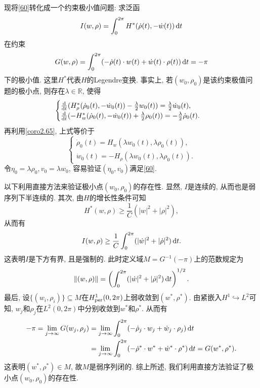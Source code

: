 \documentclass[12pt,a4paper]{article}
\begin{document}
现将\eqref{60}转化成一个约束极小值问题: 求泛函 
\begin{equation*}
    I(w, \rho) = \int_0^{2\pi}H^*(\dot\rho(t), -\dot w(t)) \,{\rm d}t
\end{equation*}
在约束 
\begin{equation*}
    G(w, \rho) = \int_0^{2\pi}(-\dot\rho(t) \cdot w(t) + \dot w(t) \cdot \rho(t)) \,{\rm d}t = -\pi
\end{equation*}
下的极小值. 这里$H^*$代表$H$的Legendre变换. 事实上, 若$(w_0, \rho_0)$是该约束极值问题的极小点, 则存在$\lambda \in \mathbb{R}$, 使得 
\begin{equation*}
    \begin{cases}
        \frac{{\rm d}}{{\rm d}t}(H_{\rho}^*(\dot\rho_0(t), -\dot w_0(t)) - \frac{\lambda}{2} w_0(t)) = \frac{\lambda}{2} \dot w_0(t), \\ 
        \frac{{\rm d}}{{\rm d}t}(-H_w^*(\dot\rho_0(t), -\dot w_0(t)) + \frac{\lambda}{2}\rho_0(t)) = -\frac{\lambda}{2} \dot\rho_0(t).
    \end{cases}
\end{equation*}
再利用\ref{coro2.65}, 上式等价于 
\begin{equation*}
    \begin{cases}
        \dot\rho_0(t) = H_w(\lambda w_0(t), \lambda\rho_0(t)), \\
        \dot w_0(t) = -H_{\rho}(\lambda w_0(t), \lambda\rho_0(t)).
    \end{cases}
\end{equation*}
令$\eta_0 = \lambda\rho_0, v_0 = \lambda w_0$, 容易验证$(\eta_0, v_0)$满足\eqref{60}.

以下利用直接方法来验证极小点$(w_0, \rho_0)$的存在性. 显然, $I$是连续的, 从而也是弱序列下半连续的.
其次, 由$H$的增长性条件可知 
\begin{equation*}
    H^*(w, \rho) \geq \frac{1}{C}(|w|^2 + |\rho|^2),
\end{equation*}
从而有 
\begin{equation*}
    I(w, \rho) \geq \frac{1}{C}\int_0^{2\pi}(|\dot w|^2 + |\dot \rho|^2) \,{\rm d}t.
\end{equation*}
这表明$I$是下方有界, 且是强制的. 此时定义域$M = G^{-1}(-\pi)$上的范数规定为 
\begin{equation*}
    \Vert (w, \rho)\Vert = \left(\int_0^{2\pi}(|\dot w|^2 + |\dot \rho|^2) \,{\rm d}t\right)^{1/2}.
\end{equation*}
最后, 设$\{(w_i, \rho_i)\} \subseteq M$在$H_{{\rm per}}^1(0, 2\pi)$上弱收敛到$(w^*, \rho^*)$.
由紧嵌入$H^1 \hookrightarrow L^2$可知, $w_j$和$\rho_j$在$L^2(0, 2\pi)$中分别收敛到$w^*$和$\rho^*$.
从而有 
\begin{align*}
    -\pi = \lim\limits_{j \rightarrow \infty}G(w_j, \rho_j) &= \lim\limits_{j \rightarrow \infty}\int_0^{2\pi}(-\dot\rho_j \cdot w_j + \dot w_j \cdot \rho_j) \,{\rm d}t \\ 
    &= \lim\limits_{j \rightarrow \infty}\int_0^{2\pi}(-\dot\rho^* \cdot w^* + \dot w^* \cdot \rho^*) \,{\rm d}t = G(w^*, \rho^*).
\end{align*}
这表明$(w^*, \rho^*) \in M$, 故$M$是弱序列闭的. 综上所述, 我们利用直接方法验证了极小点$(w_0, \rho_0)$的存在性.
\end{document}
